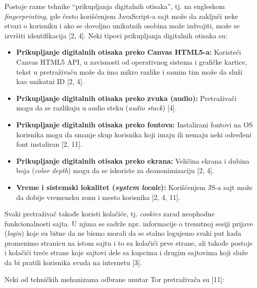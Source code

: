 \documentclass[
]{article}
\begin{document}
Postoje razne tehnike ``prikupljanja digitalnih otisaka'', tj. na engleskom
\emph{fingerprinting}, gde često korišćenjem JavaScript-a sajt može da zaključi
neke stvari o korisniku i ako se dovoljno unikatnih osobina može
izdvojiti, može se izvršiti identifikacija [2, 4]. Neki tipovi
prikupljanja digitalnih otisaka su:

\begin{itemize}
\item
  \textbf{Prikupljanje digitalnih otisaka preko Canvas HTML5-a:} Koristeći Canvas HTML5 API, u
  zavisnosti od operativnog sistema i grafičke kartice, tekst u
  pretraživaču može da ima mikro razlike i samim tim može da služi kao
  unikatni ID [2, 4].
\item
  \textbf{Prikupljanje digitalnih otisaka preko zvuka (audio):} Pretraživači mogu da se razlikuju u
  audio steku (\emph{audio stack}) [4].
\item
  \textbf{Prikupljanje digitalnih otisaka preko fontova:} Instalirani fontovi na OS korisnika mogu
  da smanje skup korisnika koji imaju ili nemaju neki određeni font
  instaliran [2, 11].
\item
  \textbf{Prikupljanje digitalnih otisaka preko ekrana:} Veličina ekrana i dubina boja (\emph{color
  depth}) mogu da se iskoriste za deanonimizaciju [2, 4].
\item
  \textbf{Vreme i sistemski lokalitet (\emph{system locale}):} Korišćenjem JS-a
  sajt može da dobije vremensku zonu i mesto korisnika [2, 4, 11].
\end{itemize}

Svaki pretraživač takođe koristi kolačiće, tj. \emph{cookies} zarad neophodne
funkcionalnosti sajta. U njima se sadrže npr. informacije o trenutnoj
sesiji prijave (\emph{login}) koje su bitne da ne bismo morali da se stalno logujemo
svaki put kada promenimo stranicu na istom sajtu i to su kolačići prve strane, ali takođe postoje i kolačići treće strane koje sajtovi dele sa
kupcima i drugim sajtovima koji služe da bi pratili korisnika svuda na
internetu [3].

Neki od tehničkih mehanizama odbrane unutar Tor pretraživača su
[11]:
\end{document}
